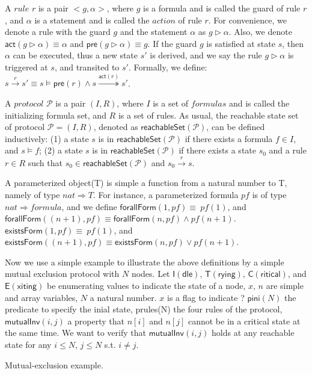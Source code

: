 \documentclass[final]{IEEEtran}
\def \andc {\wedge }
\def \orc {\vee }
\begin{document}
{{A $rule$ $r$ is a pair $<g,\alpha>$, where $g$ is a formula and is called the guard of rule $r$, and $\alpha$ is a statement and is called the $action$ of rule $r$.
 For convenience, we denote a rule with the guard $g$ and the statement $\alpha$ as $g \vartriangleright \alpha$. Also, we denote $\mathsf{act}(g \vartriangleright \alpha)\equiv \alpha$ and $\mathsf{pre}(g \vartriangleright \alpha)\equiv g$. If the guard $g$ is satisfied at state $s$, then $\alpha$ can be executed, thus a new state $s'$ is derived, and we say the rule $g \vartriangleright \alpha$ is triggered at $s$, and transited to $s'$. Formally, we define: $s\overset{r}{\rightarrow } s' \equiv s\models \mathsf{pre}(r) \wedge s\overset{\mathsf{act}(r)}{\twoheadrightarrow } s'$.

A $protocol$ $\mathcal{P}$ is a pair $(I,R)$, where $I$ is a set of $formulas$ and is called the initializing formula  set, and $R$ is a set of rules. %
 As usual, the reachable state set of protocol  $\mathcal{P}=(I,R)$, denoted as $\mathsf{reachableSet}(\mathcal{P})$, can be defined inductively: (1) a state $s$ is in
$\mathsf{reachableSet}(\mathcal{P})$ if there exists a formula $f \in I$, and $s \models  f$; (2) a state $s$ is in
$\mathsf{reachableSet}(\mathcal{P})$ if there exists a  state $s_0$  and a rule $r \in R$ such that $s_0 \in \mathsf{reachableSet}(\mathcal{P})$ and $s_0\overset{r}{\rightarrow } s$.

A parameterized object(T) is simple a function from a natural number to T, namely of type $nat \Rightarrow T$. For instance, a parameterized formula $pf$ is of type $nat \Rightarrow formula$, and we define
$\mathsf{forallForm}(1,pf)\equiv~pf(1)$, and $\mathsf{forallForm}((n+1),pf)\equiv\mathsf{forallForm}(n,pf) \andc pf(n +1)$. $\mathsf{existsForm}(1,pf)\equiv~pf(1)$, and $\mathsf{existsForm}((n+1),pf)\equiv\mathsf{existsForm}(n,pf) \orc pf(n +1)$.

}



Now we use a simple example to illustrate the above definitions by a simple mutual exclusion protocol with $N$ nodes. Let $\mathsf{I(dle)}$, $\mathsf{T(rying)}$,
 $\mathsf{C(ritical)}$, and  $\mathsf{E(xiting)}$  be enumerating values to indicate the state of a node, $x$,    $n$ are  simple and array variables, $N$ a natural number. $x$ is a flag to indicate ?   $\mathsf{pini}(N)$   the predicate to specify the inial state, prules(N) the four rules of the protocol, $\mathsf{mutualInv}(i,j)$ a property that $n[i]$ and $ n[j]$ cannot be in a critical state at the same time. We want to verify that $\mathsf{mutualInv}(i,j)$ holds at any reachable state for any $i\le N$, $j \le N$ s.t. $i \neq j$.
\vspace{-0.3cm}
\begin{example}\label{example1}Mutual-exclusion example.


\end{example}}
\end{document}

